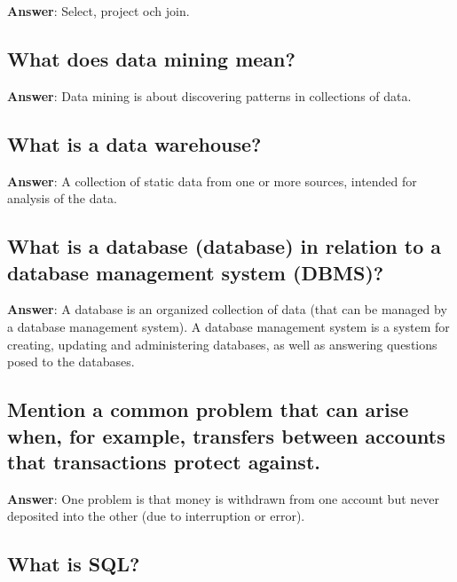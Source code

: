 \documentclass[a4paper,11pt,oneside]{article}
\begin{document}
\begin{sloppypar}
\label{q:279:sa:en:True}

\textbf{Answer}: Select, project och join.



\subsection{What does data mining mean?}

\label{q:280:sa:en:True}

\textbf{Answer}: Data mining is about discovering patterns in collections of data.



\subsection{What is a data warehouse?}

\label{q:281:sa:en:True}

\textbf{Answer}: A collection of static data from one or more sources, intended for analysis of the data.



\subsection{What is a database (database) in relation to a database management system (DBMS)?}

\label{q:282:sa:en:True}

\textbf{Answer}: A database is an organized collection of data (that can be managed by a database management system). A database management system is a system for creating, updating and administering databases, as well as answering questions posed to the databases.



\subsection{Mention a common problem that can arise when, for example, transfers between accounts that transactions protect against.}

\label{q:283:sa:en:True}

\textbf{Answer}: One problem is that money is withdrawn from one account but never deposited into the other (due to interruption or error).



\subsection{What is SQL?}


\end{sloppypar}
\end{document}

